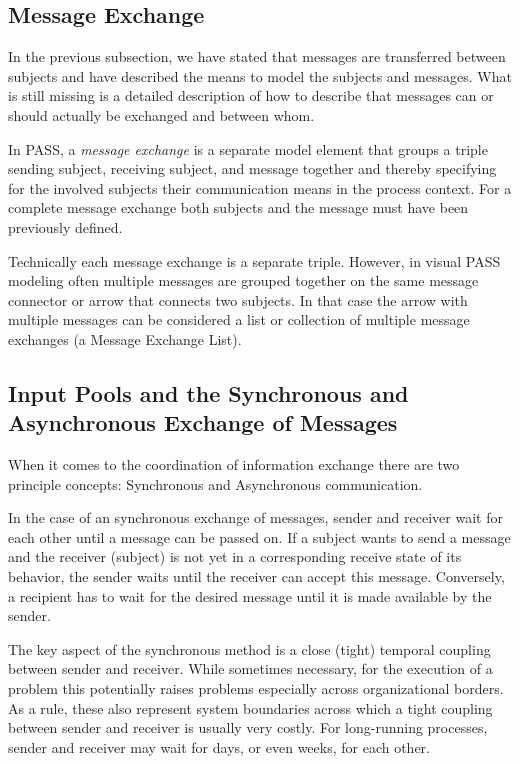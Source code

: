 \subsection{Message Exchange}

In the previous subsection, we have stated that messages are transferred between subjects and have described the means to model the subjects and messages. What is still missing is a detailed description of how to describe that messages can or should actually be exchanged and between whom.

In PASS, a \textit{message exchange} is a separate model element that groups a triple sending subject, receiving subject, and message together and thereby specifying for the involved subjects their communication means in the process context. For a complete message exchange both subjects and the message must have been previously defined.

Technically each message exchange is a separate triple. However, in visual PASS modeling often multiple messages are grouped together on the same message connector or arrow that connects two subjects. In that case the arrow with multiple messages can be considered a list or collection of multiple message exchanges (a Message Exchange List).


\subsection{Input Pools and the Synchronous and Asynchronous Exchange of Messages}

When it comes to the coordination of information exchange there are two principle concepts: Synchronous and Asynchronous communication. 

In the case of an synchronous exchange of messages, sender and receiver wait for each other until a message can be passed on. If a subject wants to send a message and the receiver (subject) is not yet in a corresponding receive state of its behavior, the sender waits until the receiver can accept this message. Conversely, a recipient has to wait for the desired message until it is made available by the sender.

The key aspect of the synchronous method is a close (tight) temporal coupling between sender and receiver. While sometimes necessary, for the execution of a problem this potentially raises problems especially across organizational borders. As a rule, these also represent system boundaries across which a tight coupling between sender and receiver is usually very costly. For long-running processes, sender and receiver may wait for days, or even weeks, for each other.

